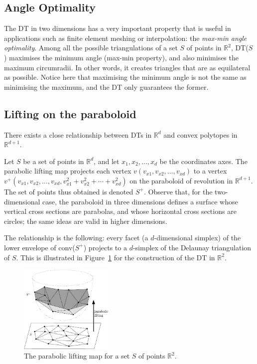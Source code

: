 %
\subsection{Angle Optimality}
The DT in two dimensions has a very important property that is useful in applications such as finite element meshing or interpolation: the \emph{max-min angle optimality}. Among all the possible triangulations of a set $S$ of points in $\mathbb{R}^2$, DT($S$) maximises the minimum angle (max-min property), and also minimises the maximum circumradii. 
In other words, it creates triangles that are as equilateral as possible. 
Notice here that maximising the minimum angle is not the same as minimising the maximum, and the DT only guarantees the former.


\subsection{Lifting on the paraboloid}
\label{sec:parabolic_lifting}

There exists a close relationship between DTs in $\mathbb{R}^{d}$ and convex polytopes in $\mathbb{R}^{d+1}$. 

Let $S$ be a set of points in $\mathbb{R}^{d}$, and let $x_{1}, x_{2}, \ldots , x_{d}$ be the coordinates axes. 
The parabolic lifting map projects each vertex $v(v_{x1}, v_{x2}, \ldots , v_{xd})$ to a vertex $v^{+}(v_{x1}, v_{x2}, \ldots , v_{xd}, v_{x1}^{2}+v_{x2}^{2}+\cdots+v_{xd}^{2})$ on the paraboloid of revolution in $\mathbb{R}^{d+1}$. 
The set of points thus obtained is denoted $S^{+}$. 
Observe that, for the two-dimensional case, the paraboloid in three dimensions defines a surface whose vertical cross sections are parabolas, and whose horizontal cross sections are circles; the same ideas are valid in higher dimensions. 

%

The relationship is the following: every facet (a $d$-dimensional simplex) of the lower envelope of conv($S^{+}$) projects to a $d$-simplex of the Delaunay triangulation of $S$. 
This is illustrated in Figure~\ref{fig:paraboloid} for the construction of the DT in $\mathbb{R}^{2}$. 
\begin{figure}
  \centering
  \includegraphics[width=0.4\textwidth]{figs/paraboloid}
  \caption{The parabolic lifting map for a set $S$ of points $\mathbb{R}^2$.}
\label{fig:paraboloid}
\end{figure}

